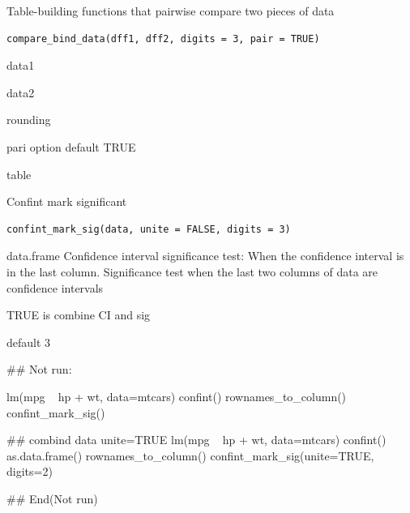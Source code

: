 \documentclass[a4paper]{book}
\begin{document}
%
\begin{Description}
Table-building functions that pairwise compare two pieces of data
\end{Description}
%
\begin{Usage}
\begin{verbatim}
compare_bind_data(dff1, dff2, digits = 3, pair = TRUE)
\end{verbatim}
\end{Usage}
%
\begin{Arguments}
\begin{ldescription}
\item[\code{dff1}] data1

\item[\code{dff2}] data2

\item[\code{digits}] rounding

\item[\code{pair}] pari option default TRUE
\end{ldescription}
\end{Arguments}
%
\begin{Value}
table
\end{Value}
%
\begin{Description}
Confint mark significant
\end{Description}
%
\begin{Usage}
\begin{verbatim}
confint_mark_sig(data, unite = FALSE, digits = 3)
\end{verbatim}
\end{Usage}
%
\begin{Arguments}
\begin{ldescription}
\item[\code{data}] data.frame Confidence interval significance test: When the confidence interval is in the last column.  Significance test when the last two columns of data are confidence intervals

\item[\code{unite}] TRUE is combine CI and sig

\item[\code{digits}] default 3
\end{ldescription}
\end{Arguments}
%
\begin{Examples}
\begin{ExampleCode}

\#\# Not run: 

lm(mpg ~ hp + wt, data=mtcars)%
 confint()%
  rownames_to_column()%
  confint_mark_sig()

## combind data unite=TRUE
  lm(mpg ~ hp + wt, data=mtcars)%
     confint()%
     as.data.frame()%
     rownames_to_column()%
     confint_mark_sig(unite=TRUE, digits=2)



  
## End(Not run)

\end{ExampleCode}
\end{Examples}
\end{document}

